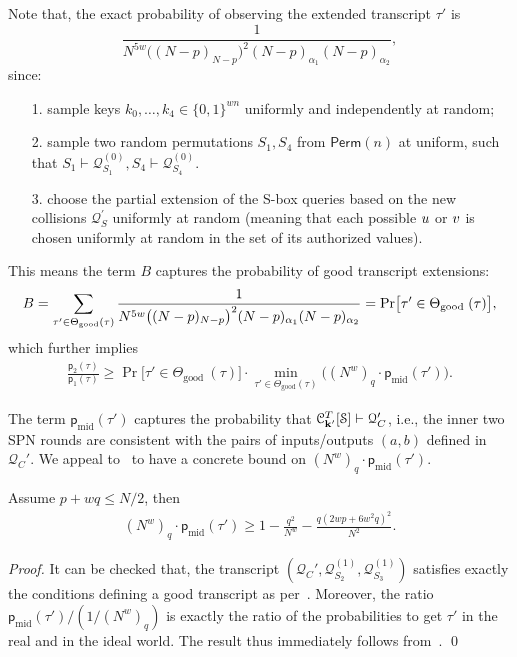 Note that, the exact probability of observing the extended transcript $\tau'$ is
%
%
$$\frac{1}{N^{5w}\big((N-p)_{N-p}\big)^2(N-p)_{\alpha_1}(N-p)_{\alpha_2}},$$
%
since:
%
\begin{itemize}
	\item[1.] sample keys $k_0,\ldots,k_4\in\{0,1\}^{wn}$ uniformly and independently at random;
	\item[2.] sample two random permutations $S_1,S_4$ from $\mathsf{Perm}(n)$ at uniform, such that $S_1\vdash\mathcal{Q}_{S_1}^{(0)},S_4\vdash\mathcal{Q}_{S_4}^{(0)}$.
	\item[3.] choose the partial extension of the S-box queries based on the new collisions $\mathcal{Q}_{S}^{\prime}$ uniformly at random (meaning that each possible $\mathnormal{u}$ or $\mathnormal{v}$ is chosen uniformly at random in the set of its authorized values).
\end{itemize}
%
%
This means the term $B$ captures the probability of good transcript extensions:
%
%
\begin{align}
B=\sum_{\tau^{\prime} \in \Theta_{\mathrm{good}}(\tau)}
	\frac{1}{N^{5w}\big((N-p)_{N-p}\big)^2(N-p)_{\alpha_1}(N-p)_{\alpha_2}}={\Pr}\big[ \tau' \in \Theta_{\text {good }}(\tau)\big],   \notag
\end{align}
%
%
which further implies
%
%
\begin{align}
\frac{\mathsf{p}_{2}(\tau)}{\mathsf{p}_{1}(\tau)}   \geq  {\Pr}\big[ \tau' \in \Theta_{\text {good }}(\tau)\big]\cdot
  \min_{\tau' \in \Theta_{\mathrm{good}}(\tau)}\big((N^w)_q\cdot\mathsf{p}_{\mathrm{mid}}(\tau')\big). 
\label{eq:ratio-divide-4-rounds}
\end{align}
%
%


The term $\mathsf{p}_{\mathrm{mid}}(\tau')$ captures the probability that $\mathcal{C}_{\mathbf{k}'}^T[\mathcal{S}] \vdash \mathcal{Q}_C'$, i.e., the inner two SPN rounds are consistent with the pairs of inputs/outputs $(a,b)$ defined in $\mathcal{Q}_C'$. We appeal to~\cite{EPRINT:CogLee18} to have a concrete bound on $(N^w)_q\cdot\mathsf{p}_{\mathrm{mid}}(\tau')$.

\begin{lemma}
	\label{lemma:bound-middle-two-rounds}
	
	Assume $p+wq\leq N/2$, then
	\begin{align}
	(N^w)_q\cdot\mathsf{p}_{\mathrm{mid}}(\tau') \geq 1-\frac{q^2}{N^w}-\frac{q(2wp+6w^2q)^2}{N^2}.
	\label{eq:bound-on-epsilon-mid}
	\end{align}
\end{lemma}
\begin{proof}
It can be checked that, the transcript $(\mathcal{Q}_C',\mathcal{Q}_{S_2}^{(1)},\mathcal{Q}_{S_3}^{(1)})$ satisfies exactly the conditions defining a good transcript as per~\cite[page 16]{EPRINT:CogLee18}. Moreover,
the ratio $\mathsf{p}_{\mathrm{mid}}(\tau')/(1/(N^w)_q)$ is exactly the ratio of the probabilities to get $\tau'$ in the real and in the ideal world. The result thus immediately follows from~\cite[Lemma 9]{EPRINT:CogLee18}.             \qed
\end{proof}



